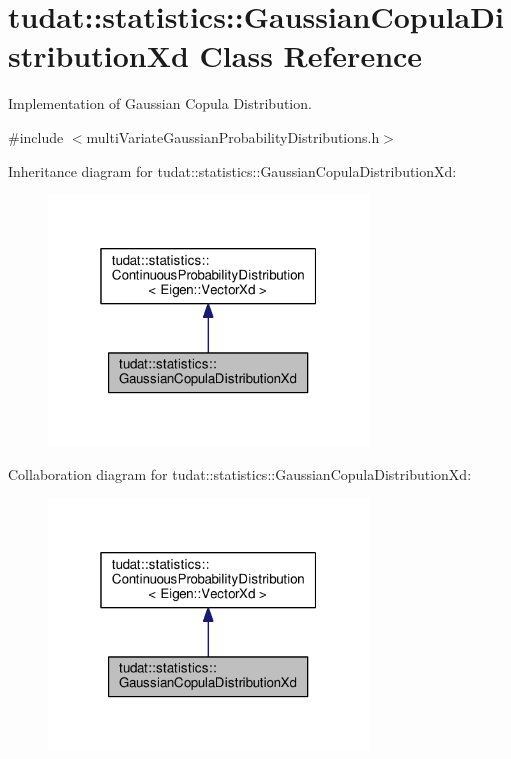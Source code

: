 \hypertarget{classtudat_1_1statistics_1_1GaussianCopulaDistributionXd}{}\section{tudat\+:\+:statistics\+:\+:Gaussian\+Copula\+Distribution\+Xd Class Reference}
\label{classtudat_1_1statistics_1_1GaussianCopulaDistributionXd}


Implementation of Gaussian Copula Distribution.  




{\ttfamily \#include $<$multi\+Variate\+Gaussian\+Probability\+Distributions.\+h$>$}



Inheritance diagram for tudat\+:\+:statistics\+:\+:Gaussian\+Copula\+Distribution\+Xd\+:
\nopagebreak
\begin{figure}[H]
\begin{center}
\leavevmode
\includegraphics[width=241pt]{classtudat_1_1statistics_1_1GaussianCopulaDistributionXd__inherit__graph}
\end{center}
\end{figure}


Collaboration diagram for tudat\+:\+:statistics\+:\+:Gaussian\+Copula\+Distribution\+Xd\+:
\nopagebreak
\begin{figure}[H]
\begin{center}
\leavevmode
\includegraphics[width=241pt]{classtudat_1_1statistics_1_1GaussianCopulaDistributionXd__coll__graph}
\end{center}
\end{figure}

